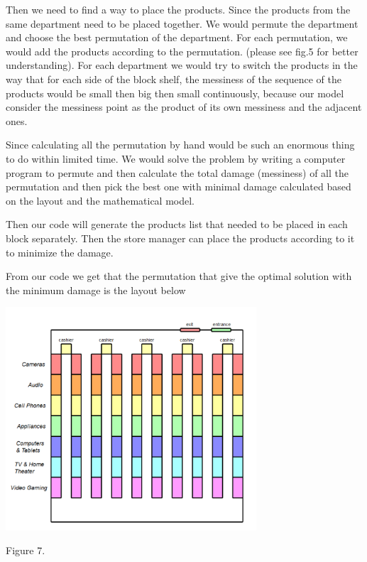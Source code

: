 \par Then we need to find a way to place the products. Since the products from the same department need to be placed together. We would permute the department and choose the best permutation of the department. For each permutation, we would add the products according to the permutation. (please see fig.5 for better understanding). For each department we would try to switch the products in the way that for each side of the block shelf, the messiness of the sequence of the products would be small then big then small continuously, because our model consider the messiness point as the product of its own messiness and the adjacent ones. 
\newline

\par Since calculating all the permutation by hand would be such an enormous thing to do within limited time. We would solve the problem by writing a computer program to permute and then calculate the total damage (messiness) of all the permutation and then pick the best one with minimal damage calculated based on the layout and the mathematical model.
\newline

\par Then our code will generate the products list that needed to be placed in each block separately. Then the store manager can place the products according to it to minimize the damage.
\newline

\par From our code we get that the permutation that give the optimal solution with the minimum damage is the layout below

\begin{center}
\includegraphics[width=0.7\textwidth]{fig4.3.PNG} 
\end{center}
\begin{center}
Figure 7.
\end{center}
